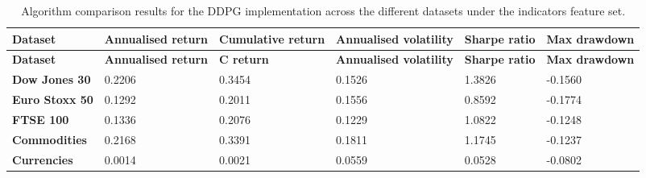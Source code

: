 \begin{longtable}{|l|p{2.1cm}|p{2.1cm}|p{2.1cm}|p{1.5cm}|p{2cm}|}
    \caption{Algorithm comparison results for the DDPG implementation across the different datasets under the indicators feature set.}
    \label{tab:experiment_algorithms_ddpg}
    \\ 
    \hline
    \textbf{Dataset} & \textbf{Annualised return} & \textbf{Cumulative return} & \textbf{Annualised volatility} & \textbf{Sharpe ratio} & \textbf{Max drawdown}  \\ \midrule
    \endfirsthead

    \hline
    \textbf{Dataset} & \textbf{Annualised return} & \textbf{C return} & \textbf{Annualised volatility} & \textbf{Sharpe ratio} & \textbf{Max drawdown}  \\ \midrule
    \endhead

    \endfoot
    \hline

    \textbf{Dow Jones 30} & 0.2206 & 0.3454 & 0.1526 & 1.3826 & -0.1560 \\ \hline
    \textbf{Euro Stoxx 50} & 0.1292 & 0.2011 & 0.1556 & 0.8592 & -0.1774 \\ \hline
    \textbf{FTSE 100} & 0.1336 & 0.2076 & 0.1229 & 1.0822 & -0.1248 \\ \hline
    \textbf{Commodities} & 0.2168 & 0.3391 & 0.1811 & 1.1745 & -0.1237 \\ \hline
    \textbf{Currencies} & 0.0014 & 0.0021 & 0.0559 & 0.0528 & -0.0802 \\ \hline
\end{longtable}